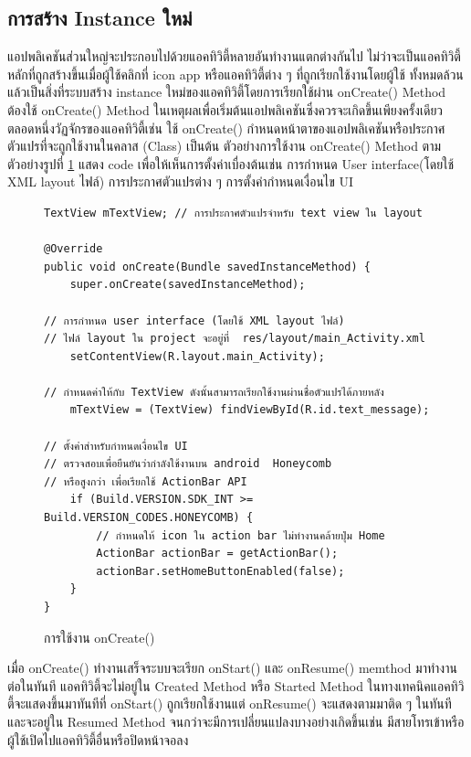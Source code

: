 	\subsection{การสร้าง Instance ใหม่}
	แอปพลิเคชันส่วนใหญ่จะประกอบไปด้วยแอคทิวิตี้หลายอันทำงานแตกต่างกันไป  ไม่ว่าจะเป็นแอคทิวิตี้หลักที่ถูกสร้างขึ้นเมื่อผู้ใช้คลิกที่ icon app หรือแอคทิวิตี้ต่าง ๆ ที่ถูกเรียกใช้งานโดยผู้ใช้ ทั้งหมดล้วนแล้วเป็นสิ่งที่ระบบสร้าง instance ใหม่ของแอคทิวิตี้โดยการเรียกใช้ผ่าน onCreate() Method ต้องใช้ onCreate() Method ในเหตุผลเพื่อเริ่มต้นแอปพลิเคชันซึ่งควรจะเกิดขึ้นเพียงครั้งเดียวตลอดหนึ่งวัฏจักรของแอคทิวิตี้เช่น ใช้ onCreate() กำหนดหน้าตาของแอปพลิเคชันหรือประกาศตัวแปรที่จะถูกใช้งานในคลาส (Class) เป็นต้น ตัวอย่างการใช้งาน onCreate() Method ตามตัวอย่างรูปที่ \ref{Fig:onCreate} แสดง code เพื่อให้เห็นการตั้งค่าเบื่องต้นเช่น การกำหนด User interface(โดยใช้ XML layout ไฟล์) การประกาศตัวแปรต่าง ๆ การตั้งค่ากำหนดเงื่อนไข UI 
					\begin{figure}[H]
						{\begin{lstlisting}
TextView mTextView; // การประกาศตัวแปรจำหรับ text view ใน layout

@Override
public void onCreate(Bundle savedInstanceMethod) {
	super.onCreate(savedInstanceMethod);

// การกำหนด user interface (โดยใช้ XML layout ไฟล์) 
// ไฟล์ layout ใน project จะอยู่ที่  res/layout/main_Activity.xml 
	setContentView(R.layout.main_Activity);

// กำหนดค่าให้กับ TextView ดังนั้นสามารถเรียกใช้งานผ่านชื่อตัวแปรได้ภายหลัง
	mTextView = (TextView) findViewById(R.id.text_message);

// ตั้งค่าสำหรับกำหนดเงื่อนไข UI 
// ตรวจสอบเพื่อยืนยันว่ากำลังใช้งานบน android  Honeycomb   
// หรือสูงกว่า เพื่อเรียกใช้ ActionBar API  
	if (Build.VERSION.SDK_INT >= Build.VERSION_CODES.HONEYCOMB) {
		// กำหนดให้ icon ใน action bar ไม่ทำงานคล้ายปุ่ม Home  
		ActionBar actionBar = getActionBar();
		actionBar.setHomeButtonEnabled(false);
	}
}
							\end{lstlisting}}
						\caption{การใช้งาน onCreate()}
						\label{Fig:onCreate}
					\end{figure}
		เมื่อ onCreate() ทำงานเสร็จระบบจะเรียก onStart() และ onResume() memthod มาทำงานต่อในทันที แอคทิวิตี้จะไม่อยู่ใน Created Method หรือ Started Method ในทางเทคนิคแอคทิวิตี้จะแสดงขึ้นมาทันทีที่ onStart() ถูกเรียกใช้งานแต่ onResume() จะแสดงตามมาติด ๆ ในทันทีและจะอยู่ใน Resumed Method จนกว่าจะมีการเปลี่ยนแปลงบางอย่างเกิดขึ้นเช่น มีสายโทรเข้าหรือผู้ใช้เปิดไปแอคทิวิตี้อื่นหรือปิดหน้าจอลง
		
